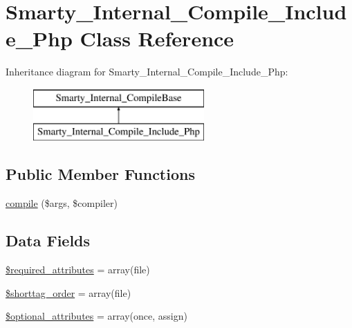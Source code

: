 \hypertarget{class_smarty___internal___compile___include___php}{}\section{Smarty\+\_\+\+Internal\+\_\+\+Compile\+\_\+\+Include\+\_\+\+Php Class Reference}
\label{class_smarty___internal___compile___include___php}
Inheritance diagram for Smarty\+\_\+\+Internal\+\_\+\+Compile\+\_\+\+Include\+\_\+\+Php\+:\begin{figure}[H]
\begin{center}
\leavevmode
\includegraphics[height=2.000000cm]{class_smarty___internal___compile___include___php}
\end{center}
\end{figure}
\subsection*{Public Member Functions}
\begin{DoxyCompactItemize}
\item 
\hyperlink{class_smarty___internal___compile___include___php_ad72fac0effa74aadee9b5ef6aed5f69f}{compile} (\$args, \$compiler)
\end{DoxyCompactItemize}
\subsection*{Data Fields}
\begin{DoxyCompactItemize}
\item 
\hyperlink{class_smarty___internal___compile___include___php_ae799507d5461de485f3a618abeecea95}{\$required\+\_\+attributes} = array(\textquotesingle{}file\textquotesingle{})
\item 
\hyperlink{class_smarty___internal___compile___include___php_a2ccb25269c3a92e8c4796c7ef23725e6}{\$shorttag\+\_\+order} = array(\textquotesingle{}file\textquotesingle{})
\item 
\hyperlink{class_smarty___internal___compile___include___php_a899d1eb4a6fecbd6ce696adb171c80a4}{\$optional\+\_\+attributes} = array(\textquotesingle{}once\textquotesingle{}, \textquotesingle{}assign\textquotesingle{})
\end{DoxyCompactItemize}


